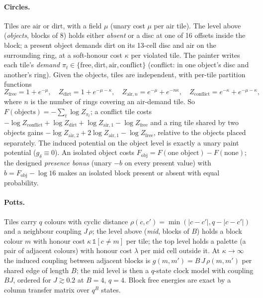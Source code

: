 \documentclass[11pt]{article}
\newcommand{\1}{\mathds{1}}
\begin{document}
\paragraph{Circles.} Tiles are $\mathrm{air}$ or $\mathrm{dirt}$, with a field $\mu$ (unary cost
$\mu$ per air tile). The level above (\emph{objects}, blocks of 8) holds either \emph{absent} or
a disc at one of 16 offsets inside the block; a present object demands dirt on its 13-cell disc
and air on the surrounding ring, at a soft-honour cost $\kappa$ per violated tile. The painter
writes each tile's \emph{demand} $\pi_t \in \{\mathrm{free}, \mathrm{dirt}, \mathrm{air}, \mathrm{conflict}\}$
(conflict: in one object's disc and another's ring). Given the objects, tiles are independent,
with per-tile partition functions
\begin{equation}
  Z_{\mathrm{free}} = 1 + e^{-\mu},\quad
  Z_{\mathrm{dirt}} = 1 + e^{-\mu-\kappa},\quad
  Z_{\mathrm{air}, n} = e^{-\mu} + e^{-n\kappa},\quad
  Z_{\mathrm{conflict}} = e^{-\kappa} + e^{-\mu-\kappa},
\end{equation}
where $n$ is the number of rings covering an air-demand tile. So $F(\text{objects}) = -\sum_t
\log Z_{\pi_t}$; a conflict tile costs
$-\log Z_{\mathrm{conflict}} + \log Z_{\mathrm{dirt}} + \log Z_{\mathrm{air},1} - \log Z_{\mathrm{free}}$
and a ring tile shared by two objects gains
$-\log Z_{\mathrm{air},2} + 2 \log Z_{\mathrm{air},1} - \log Z_{\mathrm{free}}$,
relative to the objects placed separately. The induced potential on the object level is exactly
a unary paint potential ($g_\delta \equiv 0$). An isolated object costs
$F_{\mathrm{obj}} = F(\text{one object}) - F(\text{none})$; the designed \emph{presence bonus}
(unary $-b$ on every present value) with $b = F_{\mathrm{obj}} - \log 16$ makes an isolated
block present or absent with equal probability.

\paragraph{Potts.} Tiles carry $q$ colours with cyclic distance $\rho(c, c') = \min(|c - c'|,
q - |c - c'|)$ and a neighbour coupling $J\,\rho$; the level above (\emph{mid}, blocks of $B$)
holds a block colour $m$ with honour cost $\kappa\,\1[c \ne m]$ per tile; the top level holds a
palette (a pair of adjacent colours) with honour cost $\lambda$ per mid cell outside it. At
$\kappa \to \infty$ the induced coupling between adjacent blocks is $g(m, m') = B\,J\,\rho(m, m')$
per shared edge of length $B$; the mid level is then a $q$-state clock model with coupling
$BJ$, ordered for $J \gtrsim 0.2$ at $B = 4$, $q = 4$. Block free energies are exact by a column
transfer matrix over $q^{B}$ states.
\end{document}
